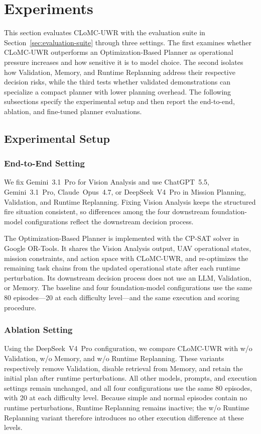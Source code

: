 \section{Experiments}
\label{sec:experiments}

This section evaluates CLoMC-UWR with the evaluation suite in
Section~\ref{sec:evaluation-suite} through three settings. The first examines
whether CLoMC-UWR outperforms an Optimization-Based Planner as
operational pressure increases and how sensitive it is to model choice. The
second isolates how Validation, Memory, and Runtime Replanning address their
respective decision risks, while the third tests whether validated
demonstrations can specialize a compact planner with lower planning overhead.
The following subsections specify the experimental setup and then report the
end-to-end, ablation, and fine-tuned planner evaluations.

\subsection{Experimental Setup}

\subsubsection{End-to-End Setting}
We fix Gemini~3.1~Pro for Vision Analysis and use ChatGPT~5.5,
Gemini~3.1~Pro, Claude~Opus~4.7, or DeepSeek~V4~Pro in Mission Planning,
Validation, and Runtime Replanning. Fixing Vision Analysis keeps the
structured fire situation consistent, so differences among the four downstream
foundation-model configurations reflect the downstream decision process.

The Optimization-Based Planner is implemented with the CP-SAT solver in Google
OR-Tools. It shares the Vision Analysis output, UAV operational states, mission constraints,
and action space with CLoMC-UWR, and re-optimizes the remaining
task chains from the updated operational state after each runtime perturbation.
Its downstream decision process does not use an LLM, Validation, or Memory. The
baseline and four foundation-model configurations use the same 80 episodes---20
at each difficulty level---and the same execution and scoring procedure.

\subsubsection{Ablation Setting}
Using the DeepSeek~V4~Pro configuration, we compare CLoMC-UWR with w/o
Validation, w/o Memory, and w/o Runtime Replanning. These variants respectively
remove Validation, disable retrieval from Memory, and retain the initial plan
after runtime perturbations. All other models, prompts, and execution settings
remain unchanged, and all four configurations use the same 80 episodes, with 20
at each difficulty level.
Because simple and normal episodes contain no runtime perturbations, Runtime
Replanning remains inactive; the w/o Runtime Replanning variant therefore
introduces no other execution difference at these levels.

